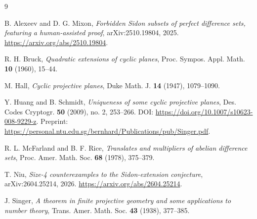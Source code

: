 \documentclass[11pt,letterpaper]{amsart}
\theoremstyle{plain}
\begin{document}
\begin{thebibliography}{9}

B. Alexeev and D. G. Mixon,
\emph{Forbidden Sidon subsets of perfect difference sets, featuring a
human-assisted proof},
arXiv:2510.19804, 2025.
\url{https://arxiv.org/abs/2510.19804}.

R. H. Bruck,
\emph{Quadratic extensions of cyclic planes},
Proc. Sympos. Appl. Math. \textbf{10} (1960), 15--44.

M. Hall,
\emph{Cyclic projective planes},
Duke Math. J. \textbf{14} (1947), 1079--1090.

Y. Huang and B. Schmidt,
\emph{Uniqueness of some cyclic projective planes},
Des. Codes Cryptogr. \textbf{50} (2009), no. 2, 253--266.
DOI: \url{https://doi.org/10.1007/s10623-008-9229-z}.
Preprint: \url{https://personal.ntu.edu.sg/bernhard/Publications/pub/Singer.pdf}.

R. L. McFarland and B. F. Rice,
\emph{Translates and multipliers of abelian difference sets},
Proc. Amer. Math. Soc. \textbf{68} (1978), 375--379.

T. Niu,
\emph{Size-4 counterexamples to the Sidon-extension conjecture},
arXiv:2604.25214, 2026.
\url{https://arxiv.org/abs/2604.25214}.

J. Singer,
\emph{A theorem in finite projective geometry and some applications to
number theory},
Trans. Amer. Math. Soc. \textbf{43} (1938), 377--385.

\end{thebibliography}
\end{document}
